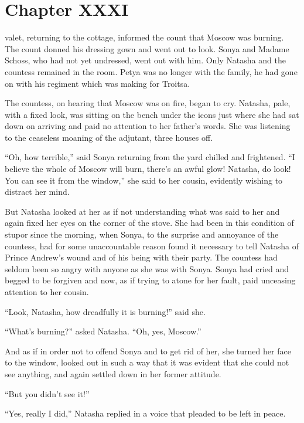\chapter*{Chapter XXXI} \ifaudio {}
\fi

 valet, returning to the cottage, informed the count that
Moscow was burning. The count donned his dressing gown and went
out to look. Sonya and Madame Schoss, who had not yet undressed,
went out with him. Only Natasha and the countess remained in the
room. Petya was no longer with the family, he had gone on with
his regiment which was making for Troitsa.

The countess, on hearing that Moscow was on fire, began to
cry. Natasha, pale, with a fixed look, was sitting on the bench
under the icons just where she had sat down on arriving and paid
no attention to her father's words. She was listening to the
ceaseless moaning of the adjutant, three houses off.

``Oh, how terrible,'' said Sonya returning from the yard chilled
and frightened. ``I believe the whole of Moscow will burn,
there's an awful glow! Natasha, do look! You can see it from the
window,'' she said to her cousin, evidently wishing to distract
her mind.

But Natasha looked at her as if not understanding what was said
to her and again fixed her eyes on the corner of the stove. She
had been in this condition of stupor since the morning, when
Sonya, to the surprise and annoyance of the countess, had for
some unaccountable reason found it necessary to tell Natasha of
Prince Andrew's wound and of his being with their party. The
countess had seldom been so angry with anyone as she was with
Sonya. Sonya had cried and begged to be forgiven and now, as if
trying to atone for her fault, paid unceasing attention to her
cousin.

``Look, Natasha, how dreadfully it is burning!'' said she.

``What's burning?'' asked Natasha. ``Oh, yes, Moscow.''

And as if in order not to offend Sonya and to get rid of her, she
turned her face to the window, looked out in such a way that it
was evident that she could not see anything, and again settled
down in her former attitude.

``But you didn't see it!''

``Yes, really I did,'' Natasha replied in a voice that pleaded to
be left in peace.

